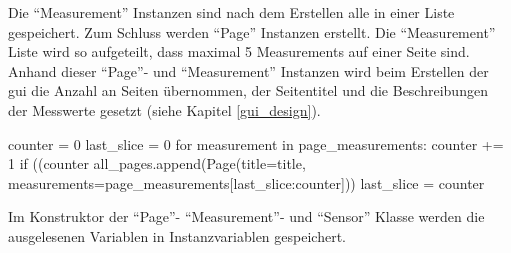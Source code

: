 Die \enquote{Measurement} Instanzen sind nach dem Erstellen alle in einer Liste gespeichert. Zum Schluss werden \enquote{Page} Instanzen erstellt. Die \enquote{Measurement} Liste wird so aufgeteilt, dass maximal 5 Measurements auf einer Seite sind. Anhand dieser \enquote{Page}- und \enquote{Measurement} Instanzen wird beim Erstellen der \acs{gui} die Anzahl an Seiten übernommen, der Seitentitel und die Beschreibungen der Messwerte gesetzt (siehe Kapitel \ref{gui_design}). 
\begin{pythoncode}
counter = 0
last_slice = 0
for measurement in page_measurements:
	counter += 1
	if ((counter %
		all_pages.append(Page(title=title, measurements=page_measurements[last_slice:counter]))
		last_slice = counter
\end{pythoncode}


Im Konstruktor der \enquote{Page}- \enquote{Measurement}- und \enquote{Sensor} Klasse werden die ausgelesenen Variablen in Instanzvariablen gespeichert.